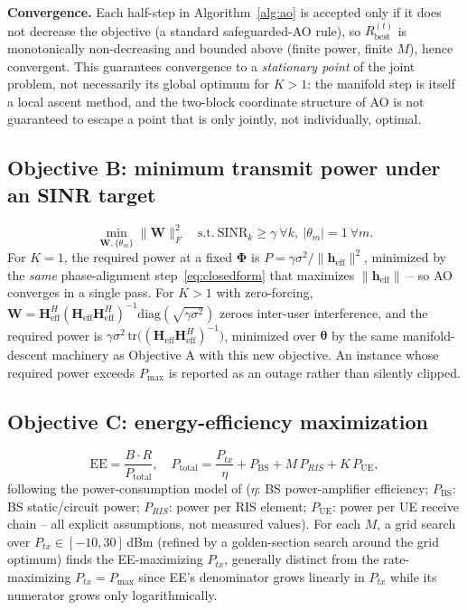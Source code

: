 \documentclass[conference]{IEEEtran}
\newcommand{\IRS}{RIS}
\begin{document}
\textbf{Convergence.} Each half-step in Algorithm~\ref{alg:ao} is
accepted only if it does not decrease the objective (a standard
safeguarded-AO rule), so $R_{\text{best}}^{(t)}$ is monotonically
non-decreasing and bounded above (finite power, finite $M$), hence
convergent. This guarantees convergence to a \emph{stationary point} of
the joint problem, not necessarily its global optimum for $K{>}1$: the
manifold step is itself a local ascent method, and the two-block
coordinate structure of AO is not guaranteed to escape a point that is
only jointly, not individually, optimal.

\subsection{Objective B: minimum transmit power under an SINR target}
\begin{equation}
\min_{\mathbf{W},\{\theta_m\}} \|\mathbf{W}\|_F^2 \quad\text{s.t.}\
\mathrm{SINR}_k \ge \gamma\ \forall k,\ |\theta_m|=1\ \forall m.
\label{eq:objB}
\end{equation}
For $K{=}1$, the required power at a fixed $\mathbf{\Phi}$ is
$P=\gamma\sigma^2/\|\mathbf{h}_{\mathrm{eff}}\|^2$, minimized by the
\emph{same} phase-alignment step~\eqref{eq:closedform} that maximizes
$\|\mathbf{h}_{\mathrm{eff}}\|$ -- so AO converges in a single pass. For
$K{>}1$ with zero-forcing, $\mathbf{W}=\mathbf{H}_{\mathrm{eff}}^H(\mathbf{H}_{\mathrm{eff}}\mathbf{H}_{\mathrm{eff}}^H)^{-1}\mathrm{diag}(\sqrt{\gamma\sigma^2})$
zeroes inter-user interference, and the required power is
$\gamma\sigma^2\,\mathrm{tr}\big((\mathbf{H}_{\mathrm{eff}}\mathbf{H}_{\mathrm{eff}}^H)^{-1}\big)$,
minimized over $\boldsymbol{\theta}$ by the same manifold-descent
machinery as Objective A with this new objective. An instance whose
required power exceeds $P_{\max}$ is reported as an outage rather than
silently clipped.

\subsection{Objective C: energy-efficiency maximization}
\begin{equation}
\mathrm{EE} = \frac{B \cdot R}{P_{\mathrm{total}}}, \quad
P_{\mathrm{total}} = \frac{P_{tx}}{\eta} + P_{\mathrm{BS}} + M\,P_{\IRS{}} + K\,P_{\mathrm{UE}},
\label{eq:ee}
\end{equation}
following the power-consumption model of \cite{huang2019ee} ($\eta$: BS
power-amplifier efficiency; $P_{\mathrm{BS}}$: BS static/circuit power;
$P_{\IRS{}}$: power per \IRS{} element; $P_{\mathrm{UE}}$: power per UE
receive chain -- all explicit assumptions, not measured values). For
each $M$, a grid search over $P_{tx}\in[-10,30]$\,dBm (refined by a
golden-section search around the grid optimum) finds the
EE-maximizing $P_{tx}$, generally distinct from the rate-maximizing
$P_{tx}=P_{\max}$ since EE's denominator grows linearly in $P_{tx}$
while its numerator grows only logarithmically.
\end{document}
